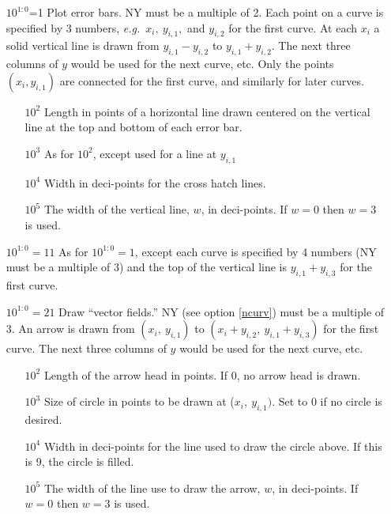 \documentclass[twoside]{MATH77}
\begin{document}
\begin{multicols}{2}
\begin{enumerate}
\begin{itemize}
        \item[$10^{1:0}$=1] Plot error bars.  NY must be a multiple of 2.
        Each point on a curve is specified by 3 numbers, {\em e.g.}\
        $x_i,\ y_{i,1},$ and $y_{i,2}$ for the first curve.  At each $x_i$
        a solid vertical line is drawn from $y_{i,1} - y_{i,2}$ to
        $y_{i,1} + y_{i,2}$. The next three columns of $y$ would be used
        for the next curve, etc. Only the points $(x_i, y_{i,1})$ are
        connected for the first curve, and similarly for later curves.
        \begin{itemize}
        \item[$10^2$] Length in points of a horizontal line drawn
        centered on the vertical line at the top and bottom of each error
        bar.
        \item[$10^3$] As for $10^2$, except used for a line at $y_{i,1}$
        \item[$10^4$] Width in deci-points for the cross hatch lines.
        \item[$10^5$] The width of the vertical line, $w$, in
        deci-points. If $w=0$ then $w = 3$ is used.
        \end{itemize}
        \item[$10^{1:0}=11$] As for $10^{1:0} = 1$, except each curve is
        specified by 4 numbers (NY must be a multiple of 3) and the top of
        the vertical line is $y_{i,1} + y_{i,3}$ for the first curve.
        \item[$10^{1:0}=21$] Draw ``vector fields.'' NY (see option
        \ref{ncurv}) must be a multiple of 3.  An arrow is drawn from
        $(x_i,~y_{i,1})$ to $(x_i+y_{i,2},~y_{i,1}+y_{i,3})$ for
        the first curve.  The next three columns of $y$ would be used
        for the next curve, etc.
        \begin{itemize}
        \item[$10^2$] Length of the arrow head in points.  If 0, no
        arrow head is drawn.
        \item[$10^3$] Size of circle in points to be drawn at
        ($x_i,~y_{i,1})$.  Set to 0 if no circle is desired.
        \item[$10^4$] Width in deci-points for the line used to
        draw the circle above.  If this is 9, the circle is filled.
        \item[$10^{5}$] The width of the line use to draw the arrow, $w$,
        in deci-points. If $w=0$ then $w = 3$ is used.
        \end{itemize}

\end{itemize}
\end{enumerate}
\end{multicols}
\end{document}
